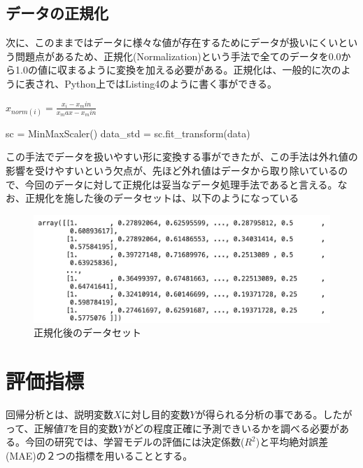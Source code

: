 \documentclass{article}
\begin{document}
\subsection{データの正規化}

次に、このままではデータに様々な値が存在するためにデータが扱いにくいという問題点があるため、正規化(Normalization)という手法で全てのデータを0.0から1.0の値に収まるように変換を加える必要がある。正規化は、一般的に次のように表され、Python上ではListing4のように書く事ができる。

\begin{center}
\begin{math}
x_{norm(i)} = \frac{x_i - x_min }{ x_max - x_min } 
\end{math}
\end{center}


\begin{python}[caption=データの正規化]
sc = MinMaxScaler()
data_std = sc.fit_transform(data)
\end{python}

この手法でデータを扱いやすい形に変換する事ができたが、この手法は外れ値の影響を受けやすいという欠点が、先ほど外れ値はデータから取り除いているので、今回のデータに対して正規化は妥当なデータ処理手法であると言える。なお、正規化を施した後のデータセットは、以下のようになっている

\begin{figure}[H]
\begin{center}
\includegraphics[width=\linewidth]{data_normalized.png}
\caption{正規化後のデータセット}
\end{center}
\end{figure}

\newpage
\section{評価指標}

回帰分析とは、説明変数\begin{math}X\end{math}に対し目的変数\begin{math}Y\end{math}が得られる分析の事である。したがって、正解値\begin{math}T\end{math}を目的変数\begin{math}Y\end{math}がどの程度正確に予測できいるかを調べる必要がある。今回の研究では、学習モデルの評価には決定係数(\begin{math}R^2\end{math})と平均絶対誤差(MAE)の２つの指標を用いることとする。
\end{document}
